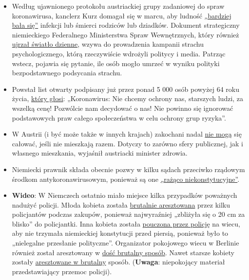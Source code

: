 \begin{itemize}
\tightlist
\item
  Według ujawnionego protokołu austriackiej grupy zadaniowej do spraw
  koronawirusa, kanclerz Kurz domagał się w marcu, aby ludność
  \href{https://www.derstandard.de/story/2000117131591/sitzungsprotokoll-der-taskforce-corona-ueber-zu-wenig-angst-in-der}{„bardziej
  bała się''} infekcji lub śmierci rodziców lub dziadków. Dokument
  strategiczny niemieckiego Federalnego Ministerstwa Spraw Wewnętrznych,
  który również
  \href{https://fragdenstaat.de/dokumente/4123-wie-wir-covid-19-unter-kontrolle-bekommen/}{ujrzał
  światło dzienne}, wzywa do prowadzenia kampanii strachu
  psychologicznego, którą rzeczywiście wdrożyli politycy i media.
  Patrząc wstecz, pojawia się pytanie, ile osób mogło umrzeć w wyniku
  polityki bezpodstawnego podsycania strachu.
\item
  Powstał list otwarty podpisany już przez ponad 5 000 osób powyżej 64
  roku życia,
  \href{https://www.change.org/p/bundeskanzlerin-corona-sch\%C3\%BCtzen-sie-\%C3\%A4ltere-nicht-um-diesen-preis-selbstbestimmt-altern-und-sterben}{który
  głosi}: „Koronawirus: Nie chcemy ochrony nas, starszych ludzi, za
  wszelką cenę! Pozwólcie nam decydować o nas! Nie powinno się ignorować
  podstawowych praw całego społeczeństwa w celu ochrony grup ryzyka''.
\item
  W Austrii (i być może także w innych krajach) zakochani nadal
  \href{https://www.unsertirol24.com/2020/04/29/oeffentliches-kuessen-wird-unter-strafe-gestellt/}{nie
  mogą} się całować, jeśli nie mieszkają razem. Dotyczy to zarówno sfery
  publicznej, jak i własnego mieszkania, wyjaśnił austriacki minister
  zdrowia.
\item
  Niemiecki prawnik składa obecnie pozwy w kilku sądach przeciwko
  rządowym środkom antykoronawirusowym, ponieważ są one
  \href{https://www.rubikon.news/artikel/eklatant-verfassungswidrig-2}{„rażąco
  niekonstytucyjne''}.
\item
  \textbf{Wideo}: W Niemczech ostatnio miało miejsce kilka przypadków
  poważnych nadużyć policji. Młoda kobieta została
  \href{https://www.youtube.com/watch?v=TZrKv4-jkK8}{brutalnie
  aresztowana} przez kilku policjantów podczas zakupów, ponieważ
  najwyraźniej „zbliżyła się o 20 cm za blisko'' do policjantki. Inna
  kobieta została
  \href{https://twitter.com/ChristianFritze/status/1256609660318224385}{pouczona
  przez policję} na wiecu, aby nie trzymała niemieckiej konstytucji
  przed piersią, ponieważ było to „nielegalne przesłanie polityczne''.
  Organizator pokojowego wiecu w Berlinie również został aresztowany w
  \href{https://www.youtube.com/watch?v=NbV2OH3uYxI}{dość brutalny
  sposób}. Nawet starsze kobiety zostały
  \href{https://www.youtube.com/watch?v=Bn11jXTjh_Y}{aresztowane w
  brutalny} sposób. (\textbf{Uwaga}: niepokojący materiał
  przedstawiający przemoc policji).
\end{itemize}

